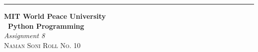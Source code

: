 \documentclass{article}
\begin{document}
\begin{titlepage} %
		
		\raggedleft\rule{1pt}{\textheight} %
		\hspace{0.05\textwidth} %
		\parbox[b]{0.75\textwidth}
		{ %
			
			{\Huge\bfseries MIT World Peace University \\[0.5\baselineskip] \ Python Programming}\\[2\baselineskip] %
			{\large\textit{Assignment 8}}\\[4\baselineskip] %
			{\Large\textsc{Naman Soni Roll No. 10}} %
			
			\vspace{0.5\textheight} %
		}
		
\end{titlepage}
\end{document}
